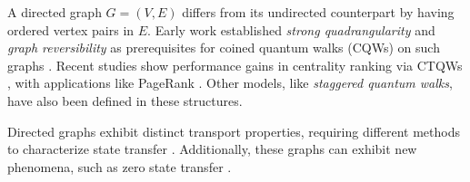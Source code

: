 \documentclass[main.tex]{subfiles}
\begin{document}
%
%
%


A directed graph $G=(V,E)$ differs from its undirected counterpart by having
ordered vertex pairs in $E$. Early work established \textit{strong
quadrangularity} and \textit{graph reversibility} as prerequisites for coined
quantum walks (CQWs) on such graphs
\cite{severiniUnderlying03,severiniDigraph03,montanaroQuantum05}. Recent
studies show performance gains in centrality ranking via CTQWs
\cite{Caruso2016}, with applications like PageRank \cite{Wang2020}. Other
models, like \textit{staggered quantum walks}, have also been defined
\cite{chagas20} in these structures.

Directed graphs exhibit distinct transport properties, requiring different
methods to characterize state transfer \cite{godsilPerfect2020}. Additionally,
these graphs can exhibit new phenomena, such as zero state transfer \cite{Sett2019}.
\end{document}
